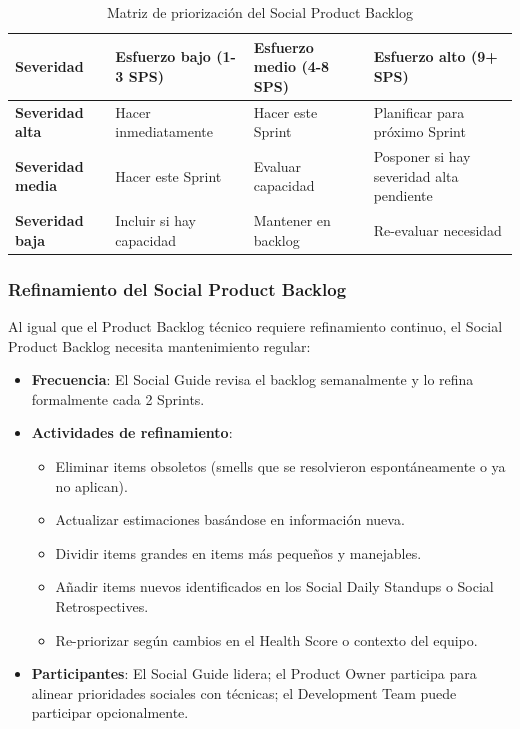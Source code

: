 \begin{table}[h]
    \centering
    \small
    \begin{tabularx}{\textwidth}{|X|X|X|X|}
        \hline
        \textbf{Severidad}       & \textbf{Esfuerzo bajo (1-3 SPS)} & \textbf{Esfuerzo medio (4-8 SPS)} & \textbf{Esfuerzo alto (9+ SPS)}          \\
        \hline
        \textbf{Severidad alta}  & Hacer inmediatamente             & Hacer este Sprint                 & Planificar para próximo Sprint           \\
        \hline
        \textbf{Severidad media} & Hacer este Sprint                & Evaluar capacidad                 & Posponer si hay severidad alta pendiente \\
        \hline
        \textbf{Severidad baja}  & Incluir si hay capacidad         & Mantener en backlog               & Re-evaluar necesidad                     \\
        \hline
    \end{tabularx}
    \caption{Matriz de priorización del Social Product Backlog}
    \label{tab:matriz-priorizacion-pbs}
\end{table}

\FloatBarrier

\subsubsection{Refinamiento del Social Product Backlog}

Al igual que el Product Backlog técnico requiere refinamiento continuo, el Social Product Backlog necesita mantenimiento regular:

\begin{itemize}
    \item \textbf{Frecuencia}: El Social Guide revisa el backlog semanalmente y lo refina formalmente cada 2 Sprints.

    \item \textbf{Actividades de refinamiento}:
          \begin{itemize}
              \item Eliminar items obsoletos (smells que se resolvieron espontáneamente o ya no aplican).
              \item Actualizar estimaciones basándose en información nueva.
              \item Dividir items grandes en items más pequeños y manejables.
              \item Añadir items nuevos identificados en los Social Daily Standups o Social Retrospectives.
              \item Re-priorizar según cambios en el Health Score o contexto del equipo.
          \end{itemize}

    \item \textbf{Participantes}: El Social Guide lidera; el Product Owner participa para alinear prioridades sociales con técnicas; el Development Team puede participar opcionalmente.
\end{itemize}

